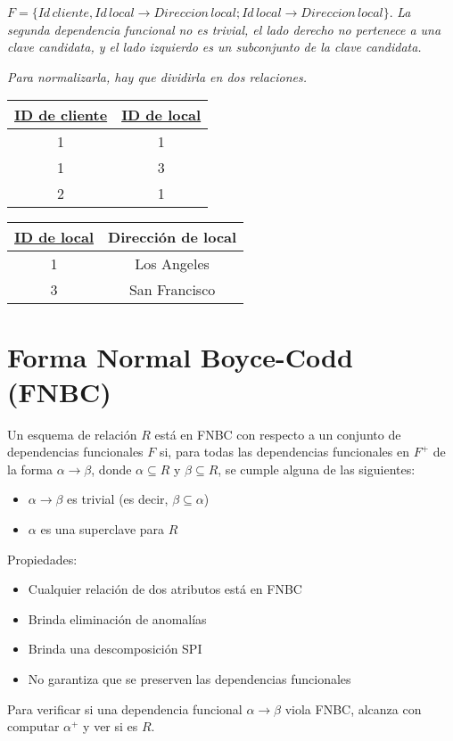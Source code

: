 \documentclass[a4paper, twoside]{article}
\begin{document}
$F=\{Id\, cliente,Id\, local\to Direccion\, local;Id\, local\to Direccion\, local\}$.
\emph{La segunda dependencia funcional no es trivial, el lado derecho
no pertenece a una clave candidata, y el lado izquierdo es un subconjunto
de la clave candidata.}

\emph{Para normalizarla, hay que dividirla en dos relaciones.}

\begin{tabular}{|c|c|}
\hline 
\uline{ID de cliente} & \uline{ID de local}\\
\hline 
\hline 
1 & 1\\
\hline 
1 & 3\\
\hline 
2 & 1\\
\hline 
\end{tabular}

\begin{tabular}{|c|c|}
\hline 
\uline{ID de local} & Dirección de local\\
\hline 
\hline 
1 & Los Angeles\\
\hline 
3 & San Francisco\\
\hline 
\end{tabular}


\section{Forma Normal Boyce-Codd (FNBC)}

Un esquema de relación $R$ está en FNBC con respecto a un conjunto
de dependencias funcionales $F$ si, para todas las dependencias funcionales
en $F^{+}$ de la forma $\alpha\to\beta$, donde $\alpha\subseteq R$
y $\beta\subseteq R$, se cumple alguna de las siguientes:
\begin{itemize}
\item $\alpha\to\beta$ es trivial (es decir, $\beta\subseteq\alpha$)
\item $\alpha$ es una superclave para $R$ 
\end{itemize}
Propiedades:
\begin{itemize}
\item Cualquier relación de dos atributos está en FNBC
\item Brinda eliminación de anomalías
\item Brinda una descomposición SPI
\item No garantiza que se preserven las dependencias funcionales
\end{itemize}
Para verificar si una dependencia funcional $\alpha\to\beta$ viola
FNBC, alcanza con computar $\alpha^{+}$ y ver si es $R$.
\end{document}
